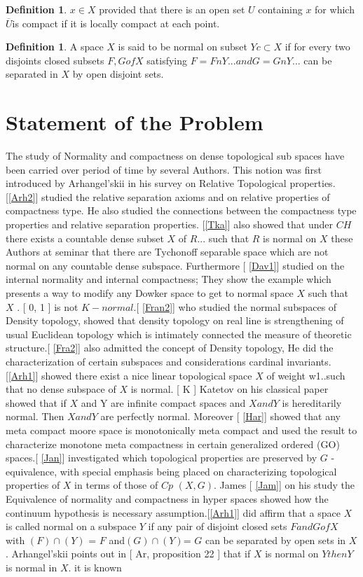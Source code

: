 \documentclass[PhD,14,a4paper]{report}
\theoremstyle{plain}
\theoremstyle{definition}
\newtheorem{defn}[thm]{Definition}
\theoremstyle{remark}
\numberwithin{figure}{section}
\numberwithin{equation}{subsection}
\begin{document}
{\begin{defn}
$x \in{X }$ provided that there is an open set $U$ containing $x$ for which $\overline{U}$is compact if it is locally compact at each point.
\end{defn}

\begin{defn}
A space $X$ is said to be normal on subset $Y c\subset{X}$ if for every two disjoints closed subsets $F, G of X$ satisfying $F = F n Y... and G = G n Y...$ can be separated in $X$ by open disjoint sets.
\end{defn}


\section{Statement of the Problem}

The study of Normality and compactness on dense topological sub spaces have been carried over period of time by several Authors. This notion was first introduced by Arhangel'skii  in his survey on Relative Topological properties. [\ref{Arh2}] studied the relative separation axioms and on relative properties of  compactness type. He also studied the connections between the compactness type properties and relative separation properties. [\ref{Tka}] also showed that under $CH$  there exists a countable dense subset $X$ of $R...$ such that $R$ is normal on $X$ these Authors at seminar that there are Tychonoff separable space which are not normal on any countable dense subspace. Furthermore [ \ref{Dav1}] studied on the internal normality and internal compactness; They show the example which presents a way to modify any Dowker space to get to normal space $X$ such that $X$ . [ 0, 1 ] is not $K - normal$.[ \ref{Fran2}] who studied the normal subspaces of Density topology, showed that density topology on real line is strengthening of usual Euclidean topology which is intimately connected the measure of theoretic structure.[ \ref{Fra2}] also admitted the concept of Density topology, He did the characterization of certain subspaces and considerations cardinal invariants. [\ref{Arh1}] showed there exist a nice linear topological space $X$ of weight w1..such that no dense subspace of $X$ is normal. [ K ] Katetov on his classical paper showed that if $X$ and Y are infinite compact spaces and $X and Y$ is hereditarily normal. Then  $X and Y$ are perfectly normal. Moreover [ \ref{Har}] showed that any meta compact moore space is monotonically meta compact and used the result to characterize monotone meta compactness in certain generalized ordered (GO) spaces.[ \ref{Jan}] investigated which topological properties are preserved by $G$ - equivalence, with special emphasis being placed on characterizing topological properties of $X$ in terms of those of $Cp$ $( X, G )$. James [ \ref{Jam}] on his study the Equivalence of normality and compactness in hyper spaces showed how the continuum hypothesis is necessary assumption.[\ref{Arh1}] did affirm that a space $X$ is called normal on a subspace $Y$ if any pair of disjoint closed sets $F and G of X$ with $( F) \cap( Y)$ = $F$ and$( G) \cap( Y)$= $G$ can be separated  by open sets in $X$. Arhangel'skii points out in [ Ar, proposition 22 ]  that if $X$ is normal on $Y then Y$ is normal in $X$. it is known }
\end{document}
